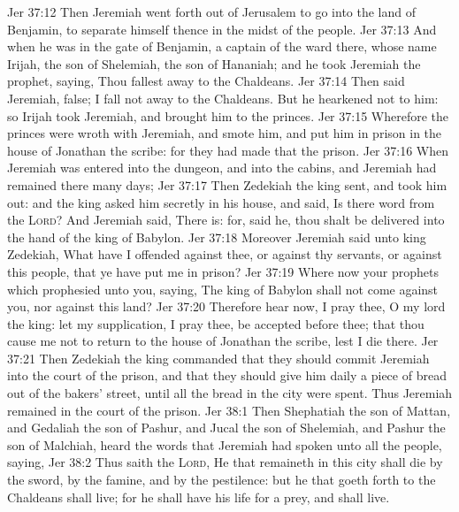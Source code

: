 \vs Jer 37:12 Then Jeremiah went forth out of Jerusalem to go into the land of Benjamin, to separate himself thence in the midst of the people.
\vs Jer 37:13 And when he was in the gate of Benjamin, a captain of the ward  there, whose name  Irijah, the son of Shelemiah, the son of Hananiah; and he took Jeremiah the prophet, saying, Thou fallest away to the Chaldeans.
\vs Jer 37:14 Then said Jeremiah,  false; I fall not away to the Chaldeans. But he hearkened not to him: so Irijah took Jeremiah, and brought him to the princes.
\vs Jer 37:15 Wherefore the princes were wroth with Jeremiah, and smote him, and put him in prison in the house of Jonathan the scribe: for they had made that the prison.
\vs Jer 37:16 When Jeremiah was entered into the dungeon, and into the cabins, and Jeremiah had remained there many days;
\vs Jer 37:17 Then Zedekiah the king sent, and took him out: and the king asked him secretly in his house, and said, Is there  word from the \textsc{Lord}? And Jeremiah said, There is: for, said he, thou shalt be delivered into the hand of the king of Babylon.
\vs Jer 37:18 Moreover Jeremiah said unto king Zedekiah, What have I offended against thee, or against thy servants, or against this people, that ye have put me in prison?
\vs Jer 37:19 Where  now your prophets which prophesied unto you, saying, The king of Babylon shall not come against you, nor against this land?
\vs Jer 37:20 Therefore hear now, I pray thee, O my lord the king: let my supplication, I pray thee, be accepted before thee; that thou cause me not to return to the house of Jonathan the scribe, lest I die there.
\vs Jer 37:21 Then Zedekiah the king commanded that they should commit Jeremiah into the court of the prison, and that they should give him daily a piece of bread out of the bakers' street, until all the bread in the city were spent. Thus Jeremiah remained in the court of the prison.
\vs Jer 38:1 Then Shephatiah the son of Mattan, and Gedaliah the son of Pashur, and Jucal the son of Shelemiah, and Pashur the son of Malchiah, heard the words that Jeremiah had spoken unto all the people, saying,
\vs Jer 38:2 Thus saith the \textsc{Lord}, He that remaineth in this city shall die by the sword, by the famine, and by the pestilence: but he that goeth forth to the Chaldeans shall live; for he shall have his life for a prey, and shall live.
